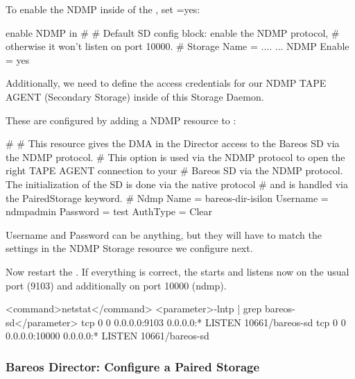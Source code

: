 To enable the NDMP \TapeAgent inside of the \bareosSd,
set =yes:

\begin{bconfig}{enable NDMP in \bareosSd}
#
# Default SD config block: enable the NDMP protocol,
# otherwise it won't listen on port 10000.
#
Storage {
   Name = ....
   ...
   NDMP Enable = yes
}
\end{bconfig}



Additionally, we need to define the access credentials for our NDMP TAPE AGENT (Secondary Storage) inside of this Storage Daemon.

These are configured by adding a NDMP resource to :

\begin{bconfig}{}
#
# This resource gives the DMA in the Director access to the Bareos SD via the NDMP protocol.
# This option is used via the NDMP protocol to open the right TAPE AGENT connection to your
# Bareos SD via the NDMP protocol. The initialization of the SD is done via the native protocol
# and is handled via the PairedStorage keyword.
#
Ndmp {
  Name = bareos-dir-isilon
  Username = ndmpadmin
  Password = test
  AuthType = Clear
}
\end{bconfig}

Username and Password can be anything, but they will have to match the settings in the \bareosDir NDMP Storage resource we configure next.

Now restart the \bareosSd.
If everything is correct, the \bareosSd starts and listens now on the usual port (9103) and additionally on port 10000 (ndmp).

\begin{commands}{}
<command>netstat</command> <parameter>-lntp | grep bareos-sd</parameter>
tcp        0      0 0.0.0.0:9103            0.0.0.0:*               LISTEN      10661/bareos-sd
tcp        0      0 0.0.0.0:10000           0.0.0.0:*               LISTEN      10661/bareos-sd
\end{commands}{}

\subsubsection{Bareos Director: Configure a Paired Storage}

